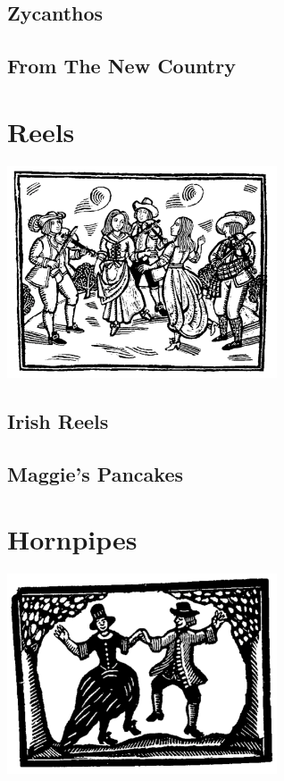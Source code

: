 \documentclass[12pt]{report}
\begin{document}
\section{Zycanthos}


\newpage
\section{From The New Country}


\chapter{Reels}
\begin{center}
\includegraphics[width=8cm]{../images/reels}
\end{center}

\section{Irish Reels}


\newpage
\section{Maggie's Pancakes}


\chapter{Hornpipes}
\begin{center}
\includegraphics[width=8cm]{../images/hornpipes}
\end{center}
\end{document}
